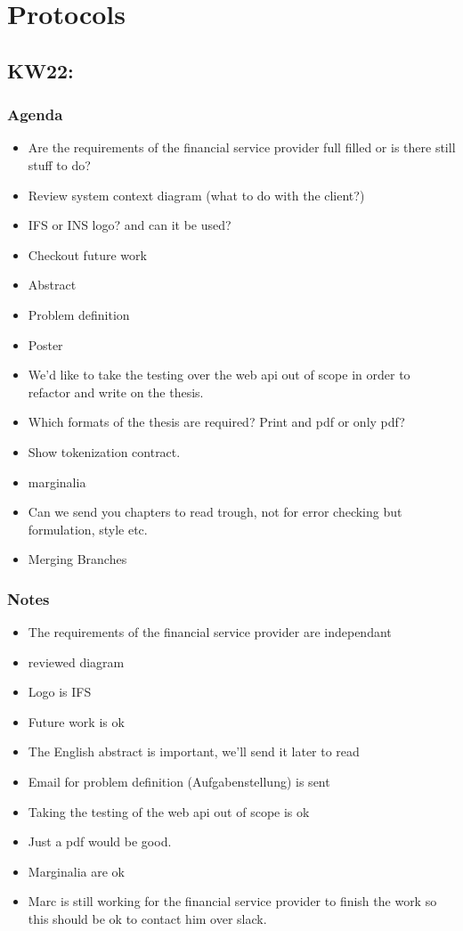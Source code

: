\chapter{Protocols}
\section{KW22:}
\subsection{Agenda}
\begin{itemize}
\item
  Are the requirements of the financial service provider full filled or
  is there still stuff to do?
\item
  Review system context diagram (what to do with the client?)
\item
  IFS or INS logo? and can it be used?
\item
  Checkout future work
\item
  Abstract
\item
  Problem definition
\item
  Poster
\item
  We'd like to take the testing over the web api out of scope in order
  to refactor and write on the thesis.
\item
  Which formats of the thesis are required? Print and pdf or only pdf?
\item
  Show tokenization contract.
\item
  marginalia
\item
  Can we send you chapters to read trough, not for error checking but
  formulation, style etc.
\item
  Merging Branches
\end{itemize}

\subsection{Notes}
\begin{itemize}
\item
  The requirements of the financial service provider are independant
\item
  reviewed diagram
\item
  Logo is IFS
\item
  Future work is ok
\item
  The English abstract is important, we'll send it later to read
\item
  Email for problem definition (Aufgabenstellung) is sent
\item
  Taking the testing of the web api out of scope is ok
\item
  Just a pdf would be good.
\item
  Marginalia are ok
\item
  Marc is still working for the financial service provider to finish the
  work so this should be ok to contact him over slack.
\end{itemize}

